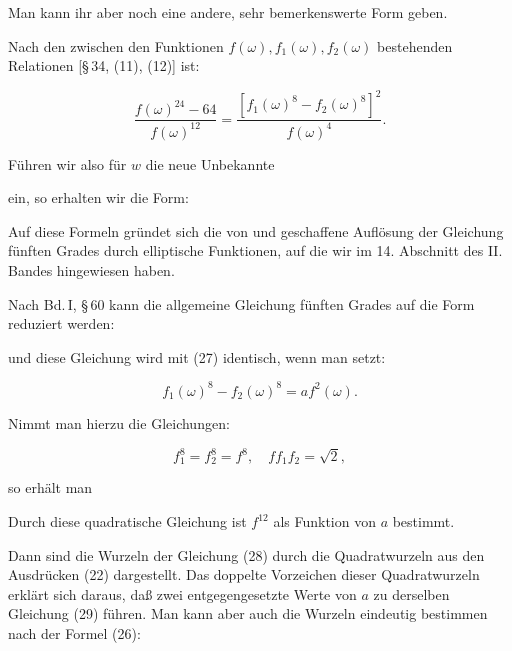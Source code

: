 
Man kann ihr aber noch eine andere, sehr bemerkenswerte Form geben.

Nach den zwischen den Funktionen $f(\omega), f_1(\omega), f_2(\omega)$
bestehenden Relationen [§\,34, (11), (12)] ist:

\[
\frac{f(\omega)^{24} - 64}{f(\omega)^{12}} = \frac{[f_1(\omega)^8 - f_2(\omega)^8]^2}{f(\omega)^4}.
\]

Führen wir also für $w$ die neue Unbekannte


ein, so erhalten wir die Form:


Auf diese Formeln gründet sich die von  und
 geschaffene Auflösung der Gleichung fünften Grades
durch elliptische Funktionen, auf die wir im 14. Abschnitt des II.
Bandes hingewiesen haben.

Nach Bd.\,I, §\,60 kann die allgemeine Gleichung fünften Grades auf die
Form reduziert werden:


und diese Gleichung wird mit (27) identisch, wenn man setzt:

\[
f_1(\omega)^8 - f_2(\omega)^8 = af^2(\omega).
\]

Nimmt man hierzu die Gleichungen:

\[
f_1^8 = f_2^8 = f^8, \quad ff_1f_2 = \sqrt{2}, %
\]

so erhält man


Durch diese quadratische Gleichung ist $f^{12}$ als Funktion von $a$
bestimmt.

Dann sind die Wurzeln der Gleichung (28) durch die Quadratwurzeln aus
den Ausdrücken (22) dargestellt. Das doppelte Vorzeichen dieser
Quadratwurzeln erklärt sich daraus, daß zwei entgegengesetzte Werte von
$a$ zu derselben Gleichung (29) führen. Man kann aber auch die Wurzeln
eindeutig bestimmen nach der Formel (26):

